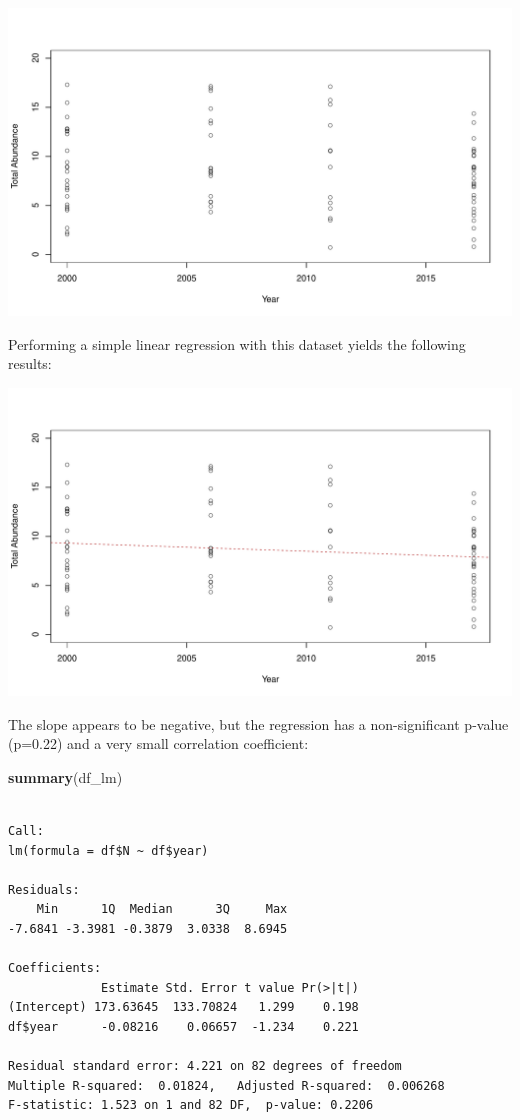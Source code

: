 \documentclass[
]{book}
\newenvironment{Shaded}{\begin{snugshade}}{\end{snugshade}}
\newcommand{\KeywordTok}[1]{\textcolor[rgb]{0.13,0.29,0.53}{\textbf{#1}}}
\newcommand{\NormalTok}[1]{#1}
\begin{document}
\includegraphics{figures/unnamed-chunk-298-1.pdf}

Performing a simple linear regression with this dataset yields the following results:

\includegraphics{figures/unnamed-chunk-299-1.pdf}

The slope appears to be negative, but the regression has a non-significant p-value (p=0.22) and a very small correlation coefficient:

\begin{Shaded}
\begin{Highlighting}[]
\KeywordTok{summary}\NormalTok{(df_lm)}
\end{Highlighting}
\end{Shaded}

\begin{verbatim}

Call:
lm(formula = df$N ~ df$year)

Residuals:
    Min      1Q  Median      3Q     Max 
-7.6841 -3.3981 -0.3879  3.0338  8.6945 

Coefficients:
             Estimate Std. Error t value Pr(>|t|)
(Intercept) 173.63645  133.70824   1.299    0.198
df$year      -0.08216    0.06657  -1.234    0.221

Residual standard error: 4.221 on 82 degrees of freedom
Multiple R-squared:  0.01824,   Adjusted R-squared:  0.006268 
F-statistic: 1.523 on 1 and 82 DF,  p-value: 0.2206
\end{verbatim}
\end{document}

